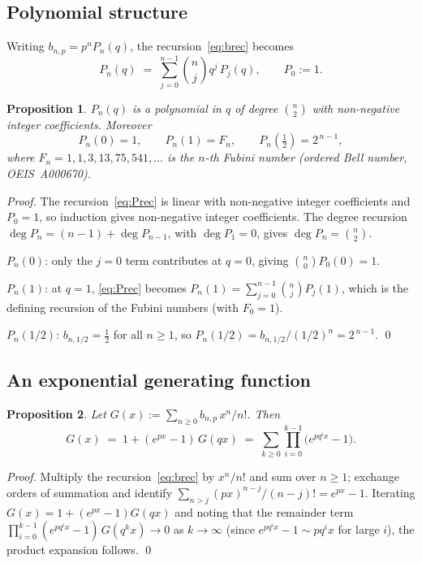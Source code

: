 \documentclass{article}
\newtheorem{proposition}{Proposition}
\theoremstyle{definition}
\theoremstyle{remark}
\begin{document}
\subsection*{Polynomial structure}

Writing $b_{n,p}=p^{n}P_{n}(q)$, the recursion~\eqref{eq:brec} becomes
\begin{equation}\label{eq:Prec}
  P_{n}(q)\;=\;\sum_{j=0}^{n-1}\binom{n}{j}q^{j}\,P_{j}(q),\qquad P_{0}:=1.
\end{equation}

\begin{proposition}\label{prop:Pstruct}
$P_{n}(q)$ is a polynomial in $q$ of degree $\binom{n}{2}$ with
\emph{non-negative integer} coefficients. Moreover
\[
  P_{n}(0)=1,\qquad P_{n}(1)=F_{n},\qquad P_{n}(\tfrac12)=2^{\,n-1},
\]
where $F_{n}=1,1,3,13,75,541,\dots$ is the $n$-th Fubini number
(ordered Bell number, \emph{OEIS~A000670}).
\end{proposition}

\begin{proof}
The recursion~\eqref{eq:Prec} is linear with non-negative integer
coefficients and $P_{0}=1$, so induction gives
non-negative integer coefficients. The degree recursion
$\deg P_{n}=(n-1)+\deg P_{n-1}$, with $\deg P_{1}=0$, gives
$\deg P_{n}=\binom{n}{2}$.

$P_{n}(0)$: only the $j=0$ term contributes at $q=0$, giving
$\binom{n}{0}P_{0}(0)=1$.

$P_{n}(1)$: at $q=1$, \eqref{eq:Prec} becomes
$P_{n}(1)=\sum_{j=0}^{n-1}\binom{n}{j}P_{j}(1)$, which is the defining
recursion of the Fubini numbers (with $F_{0}=1$).

$P_{n}(1/2)$: $b_{n,1/2}=\tfrac12$ for all $n\ge 1$, so
$P_{n}(1/2)=b_{n,1/2}/(1/2)^{n}=2^{\,n-1}$. \qed
\end{proof}

\subsection*{An exponential generating function}

\begin{proposition}
Let $G(x):=\sum_{n\ge 0}b_{n,p}\,x^{n}/n!$. Then
\begin{equation}\label{eq:egf}
  G(x)\;=\;1+(e^{px}-1)\,G(qx)
  \;=\;\sum_{k\ge 0}\prod_{i=0}^{k-1}\bigl(e^{pq^{i}x}-1\bigr).
\end{equation}
\end{proposition}

\begin{proof}
Multiply the recursion~\eqref{eq:brec} by $x^{n}/n!$ and sum over
$n\ge 1$; exchange orders of summation and identify
$\sum_{n>j}(px)^{n-j}/(n-j)!=e^{px}-1$. Iterating $G(x)=1+(e^{px}-1)G(qx)$
and noting that the remainder term
$\prod_{i=0}^{k-1}(e^{pq^{i}x}-1)\,G(q^{k}x)\to 0$ as $k\to\infty$
(since $e^{pq^{i}x}-1\sim pq^{i}x$ for large $i$), the product expansion
follows. \qed
\end{proof}
\end{document}
